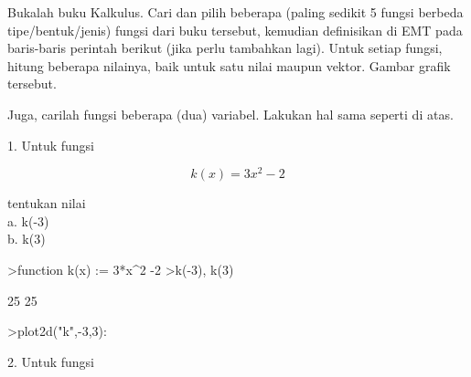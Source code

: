 \documentclass[12pt,Times new roman,letterpaper]{book}
\begin{document}
\begin{eulernootebook}
\begin{eulercomment}
\begin{eulercomment}
\begin{eulernootebook}
\begin{eulercomment}
\begin{eulercomment}
\begin{eulercomment}
\begin{eulercomment}
\begin{eulercomment}
\begin{eulercomment}
\begin{eulernotebook}
\begin{eulercomment}
\begin{eulercomment}
\begin{euleroutput}
\end{euleroutput}
\begin{eulercomment}
\begin{eulercomment}
\begin{eulercomment}
Bukalah buku Kalkulus. Cari dan pilih beberapa (paling sedikit 5
fungsi berbeda tipe/bentuk/jenis) fungsi dari buku tersebut, kemudian
definisikan di EMT pada baris-baris perintah berikut (jika perlu
tambahkan lagi). Untuk setiap fungsi, hitung beberapa nilainya, baik
untuk satu nilai maupun vektor. Gambar grafik tersebut.

Juga, carilah fungsi beberapa (dua) variabel. Lakukan hal sama seperti
di atas.

1. Untuk fungsi

\end{eulercomment}
\begin{eulerformula}
\[
k(x)=3x^2-2
\]
\end{eulerformula}
\begin{eulercomment}
tentukan nilai\\
a. k(-3)\\
b. k(3)
\end{eulercomment}
\begin{eulerprompt}
>function k(x) := 3*x^2 -2
>k(-3), k(3)
\end{eulerprompt}
\begin{euleroutput}
  25
  25
\end{euleroutput}
\begin{eulerprompt}
>plot2d("k",-3,3):
\end{eulerprompt}
\begin{eulercomment}
2. Untuk fungsi


\end{eulercomment}
\end{eulercomment}
\end{eulercomment}
\end{eulercomment}
\end{eulercomment}
\end{eulernotebook}
\end{eulercomment}
\end{eulercomment}
\end{eulercomment}
\end{eulercomment}
\end{eulercomment}
\end{eulercomment}
\end{eulernootebook}
\end{eulercomment}
\end{eulercomment}
\end{eulernootebook}
\end{document}
